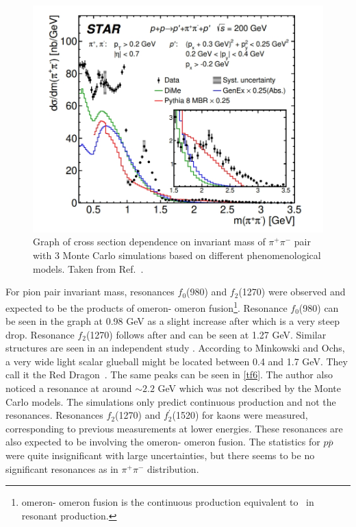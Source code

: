 \begin{figure}[ht]
    \centering
    \includegraphics[width=1\textwidth]{figures/rafalpi.jpg}
    \caption[Cross section dependence on invariant mass for $\pi^+ \pi^-$ pairs at STAR]{Graph of cross section dependence on invariant mass of $\pi^+ \pi^-$ pair with 3 Monte Carlo simulations based on different phenomenological models. Taken from Ref.~\cite{Rafal20}.}
    \label{tf7}
\end{figure}
\FloatBarrier
For pion pair invariant mass, resonances $f_0$(980) and $f_2$(1270) were observed and expected to be the products of \Pom omeron- \Pom omeron fusion\footnote{\Pom omeron- \Pom omeron fusion is the continuous production equivalent to \DPE~in resonant production.}. Resonance $f_0$(980) can be seen in the graph at 0.98 GeV as a slight increase after which is a very steep drop. Resonance $f_2$(1270) follows after and can be seen at 1.27 GeV. Similar structures are seen in an independent study \cite{Truhlar}. 
\newline
According to Minkowski and Ochs, a very wide light scalar glueball might be located between 0.4 and 1.7 GeV. They call it the Red Dragon~\cite{Truhlar}. The same peaks can be seen in \autoref{tf6}. The author also noticed a resonance at around $\sim 2.2$ GeV which was not described by the Monte Carlo models. The simulations only predict continuous production and not the resonances.
\newline
Resonances $f_2$(1270) and $f^{'}_2$(1520) for kaons were measured, corresponding to previous measurements at lower energies. These resonances are also expected to be involving the \Pom omeron- \Pom omeron fusion. The statistics for $p\overline{p}$ were quite insignificant with large uncertainties, but there seems to be no significant resonances as in $\pi^+ \pi^-$ distribution.
